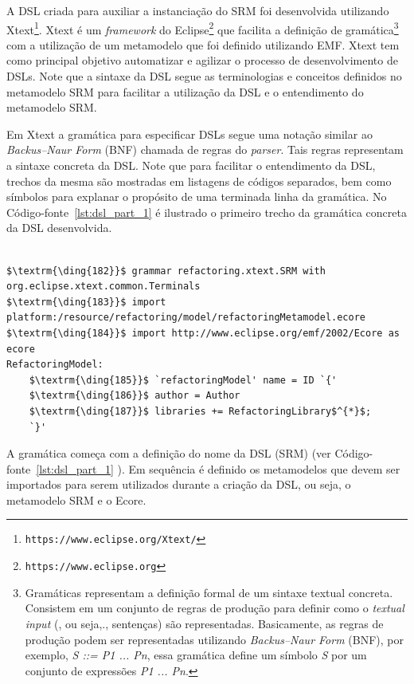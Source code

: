 A DSL criada para auxiliar a instanciação do SRM foi desenvolvida utilizando Xtext\footnote{\texttt{https://www.eclipse.org/Xtext/}}. Xtext é um \textit{framework} do Eclipse\footnote{\texttt{https://www.eclipse.org}} que facilita a definição de gramática\footnote{Gramáticas representam a definição formal de um sintaxe textual concreta. Consistem em um conjunto de regras de produção para definir como o \textit{textual input} (, ou seja,., sentenças) são representadas. Basicamente, as regras de produção podem ser representadas utilizando \textit{Backus–Naur Form} (BNF), por exemplo, \textit{S ::= P1 ... Pn}, essa gramática define um símbolo \textit{S} por um conjunto de expressões \textit{P1 ... Pn}.} 
com a utilização de um metamodelo que foi definido utilizando EMF. Xtext tem como principal objetivo automatizar e agilizar o processo de desenvolvimento de DSLs. Note que a sintaxe da DSL segue as terminologias e conceitos definidos no metamodelo SRM para facilitar a utilização da DSL e o entendimento do metamodelo SRM.

Em Xtext a gramática para especificar DSLs segue uma notação similar ao \textit{Backus–Naur Form} (BNF) chamada de regras do \textit{parser}. Tais regras representam a sintaxe concreta da DSL. Note que para facilitar o entendimento da DSL, trechos da mesma são mostradas em listagens de códigos separados, bem como símbolos para explanar o propósito de uma terminada linha da gramática. No Código-fonte~\ref{lst:dsl_part_1} é ilustrado o primeiro trecho da gramática concreta da DSL desenvolvida. 

\begin{lstlisting}[language=Xtext, frame=single, basicstyle={\scriptsize}, mathescape=true, label={lst:dsl_part_1}, caption={Gramática da DSL - parte 1}]
	
$\textrm{\ding{182}}$ grammar refactoring.xtext.SRM with org.eclipse.xtext.common.Terminals 
$\textrm{\ding{183}}$ import platform:/resource/refactoring/model/refactoringMetamodel.ecore
$\textrm{\ding{184}}$ import http://www.eclipse.org/emf/2002/Ecore as ecore
RefactoringModel: 
	$\textrm{\ding{185}}$ `refactoringModel' name = ID `{'
	$\textrm{\ding{186}}$ author = Author
	$\textrm{\ding{187}}$ libraries += RefactoringLibrary$^{*}$;
	`}'
\end{lstlisting}

A gramática começa com a definição do nome da DSL (SRM) (ver Código-fonte~\ref{lst:dsl_part_1} ). Em sequência é definido os metamodelos que devem ser importados para serem utilizados durante a criação da DSL, ou seja, o metamodelo SRM e o Ecore.

